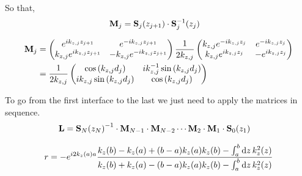 So that,
\begin{align*}
	\vb{M}_j & = \vb{S}_j\pqty{z_{j+1}} \cdot \vb{S}^{-1}_j\pqty{z_{j}}
\end{align*}

\begin{align*}
	\vb{M}_j
	                                & =
	\pmqty{
	e^{ik_{z,j}z_{j+1}}             &
	e^{-ik_{z,j}z_{j+1}}                                   \\
	k_{z,j} e^{ik_{z,j}z_{j+1}}     &
	-k_{z,j} e^{-ik_{z,j}z_{j+1}}
	} \frac{1}{2k_{z,j}}\pmqty{
	k_{z,j} e^{-ik_{z,j}z_j}        &
	e^{-ik_{z,j}z_j}                                       \\
	k_{z,j} e^{ik_{z,j}z_j}         &
	-e^{ik_{z,j}z_j}
	}                                                      \\
	                                & = \frac{1}{2k_{z,j}}
	\pmqty{
	\cos\pqty{k_{z,j}d_j}           &
	i k_{z,j}^{-1}\sin\pqty{k_{z,j}d_j}                    \\
	i k_{z,j} \sin\pqty{k_{z,j}d_j} &
		\cos\pqty{k_{z,j}d_j}
	}
\end{align*}

To go from the first interface to the last we just need to apply the matrices in sequence.
\begin{align*}
	\vb{L} & = \vb{S}_N\pqty{z_N}^{-1}\cdot\vb{M}_{N-1}\cdot\vb{M}_{N-2} \cdots \vb{M}_{2}\cdot\vb{M}_{1}\cdot \vb{S}_0\pqty{z_1}
\end{align*}

\begin{align*}
	r = -e^{i2k_z\pqty{a}a}\frac{
		k_z\pqty{b} - k_z\pqty{a} + \pqty{b-a} k_z\pqty{a} k_z\pqty{b}  - \int_a^b \dd{z} k_{z}^2\pqty{z}
	}{
		k_z\pqty{b} + k_z\pqty{a} - \pqty{b-a}k_z\pqty{a} k_z\pqty{b}  - \int_a^b \dd{z} k_{z}^2\pqty{z}
	}
\end{align*}



